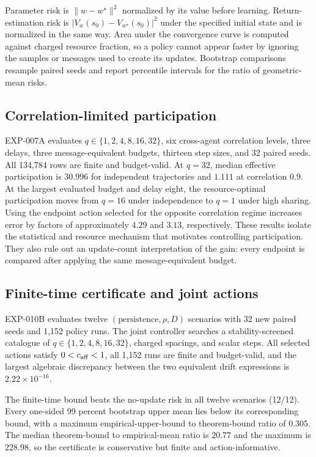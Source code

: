 \documentclass[journal]{IEEEtran}
\begin{document}
Parameter risk is $\|w-w^\star\|^2$ normalized by its value before learning.
Return-estimation risk is $|V_w(s_0)-V_{w^\star}(s_0)|^2$ under the specified initial state and is normalized in the same way.
Area under the convergence curve is computed against charged resource fraction, so a policy cannot appear faster by ignoring the samples or messages used to create its updates.
Bootstrap comparisons resample paired seeds and report percentile intervals for the ratio of geometric-mean risks.

\subsection{Correlation-limited participation}
EXP-007A evaluates $q\in\{1,2,4,8,16,32\}$, six cross-agent correlation levels, three delays, three message-equivalent budgets, thirteen step sizes, and 32 paired seeds.
All 134,784 rows are finite and budget-valid.
At $q=32$, median effective participation is $30.996$ for independent trajectories and $1.111$ at correlation $0.9$.
At the largest evaluated budget and delay eight, the resource-optimal participation moves from $q=16$ under independence to $q=1$ under high sharing.
Using the endpoint action selected for the opposite correlation regime increases error by factors of approximately $4.29$ and $3.13$, respectively.
These results isolate the statistical and resource mechanism that motivates controlling participation.
They also rule out an update-count interpretation of the gain: every endpoint is compared after applying the same message-equivalent budget.

\subsection{Finite-time certificate and joint actions}
EXP-010B evaluates twelve $(\text{persistence},\rho,D)$ scenarios with 32 new paired seeds and 1,152 policy runs.
The joint controller searches a stability-screened catalogue of $q\in\{1,2,4,8,16,32\}$, charged spacings, and scalar steps.
All selected actions satisfy $0<c_{\rm aff}<1$, all 1,152 runs are finite and budget-valid, and the largest algebraic discrepancy between the two equivalent drift expressions is $2.22\times10^{-16}$.

The finite-time bound beats the no-update risk in all twelve scenarios (12/12).
Every one-sided 99 percent bootstrap upper mean lies below its corresponding bound, with a maximum empirical-upper-bound to theorem-bound ratio of $0.305$.
The median theorem-bound to empirical-mean ratio is $20.77$ and the maximum is $228.98$, so the certificate is conservative but finite and action-informative.
\end{document}
